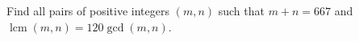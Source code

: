 Find all pairs of positive integers $(m,n)$ such that $m+n=667$ and $\operatorname{lcm}(m,n)=120\gcd(m,n)$.
